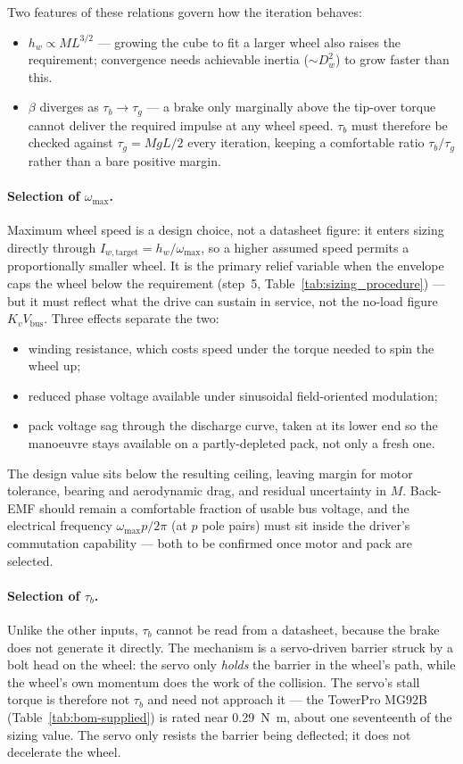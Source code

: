 Two features of these relations govern how the iteration behaves:
\begin{itemize}
  \item $h_w \propto ML^{3/2}$ --- growing the cube to fit a larger wheel also
  raises the requirement; convergence needs achievable inertia ($\sim D_w^2$)
  to grow faster than this.
  \item $\beta$ diverges as $\tau_b\to\tau_g$ --- a brake only marginally above
  the tip-over torque cannot deliver the required impulse at any wheel speed.
  $\tau_b$ must therefore be checked against $\tau_g=MgL/2$ every iteration,
  keeping a comfortable ratio $\tau_b/\tau_g$ rather than a bare positive
  margin.
\end{itemize}

\paragraph{Selection of $\omega_{\max}$.} Maximum wheel speed is a design
choice, not a datasheet figure: it enters sizing directly through
$I_{w,\text{target}}=h_w/\omega_{\max}$, so a higher assumed speed permits a
proportionally smaller wheel. It is the primary relief variable when the
envelope caps the wheel below the requirement (step~5,
Table~\ref{tab:sizing_procedure}) --- but it must reflect what the drive can
sustain in service, not the no-load figure $K_vV_{\text{bus}}$. Three effects
separate the two:
\begin{itemize}
  \item winding resistance, which costs speed under the torque needed to spin
  the wheel up;
  \item reduced phase voltage available under sinusoidal field-oriented
  modulation;
  \item pack voltage sag through the discharge curve, taken at its lower end so
  the manoeuvre stays available on a partly-depleted pack, not only a fresh
  one.
\end{itemize}
The design value sits below the resulting ceiling, leaving margin for motor
tolerance, bearing and aerodynamic drag, and residual uncertainty in $M$.
Back-EMF should remain a comfortable fraction of usable bus voltage, and the
electrical frequency $\omega_{\max}p/2\pi$ (at $p$ pole pairs) must sit inside
the driver's commutation capability --- both to be confirmed once motor and
pack are selected.

\paragraph{Selection of $\tau_b$.} Unlike the other inputs, $\tau_b$ cannot be
read from a datasheet, because the brake does not generate it directly. The
mechanism is a servo-driven barrier struck by a bolt head on the wheel: the
servo only \emph{holds} the barrier in the wheel's path, while the wheel's own
momentum does the work of the collision. The servo's stall torque is therefore
not $\tau_b$ and need not approach it --- the TowerPro MG92B
(Table~\ref{tab:bom-supplied}) is rated near \qty{0.29}{\newton\metre}, about
one seventeenth of the sizing value. The servo only resists the barrier being
deflected; it does not decelerate the wheel.

